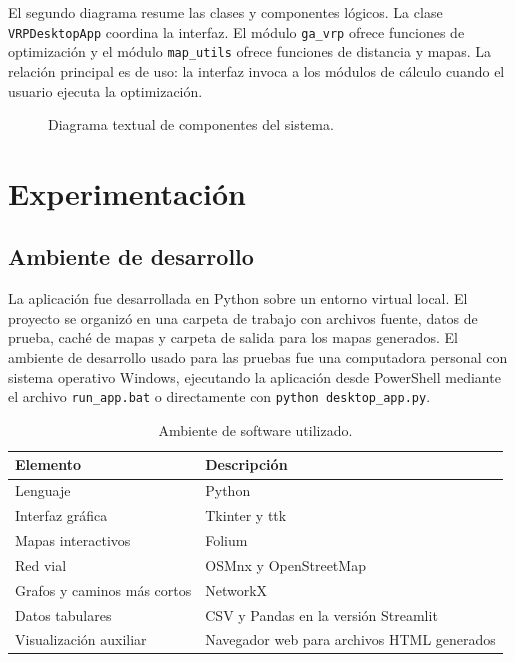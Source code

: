 \documentclass[runningheads]{llncs}
\begin{document}
El segundo diagrama resume las clases y componentes l\'ogicos. La clase
\texttt{VRPDesktopApp} coordina la interfaz. El m\'odulo \texttt{ga\_vrp} ofrece
funciones de optimizaci\'on y el m\'odulo \texttt{map\_utils} ofrece funciones de
distancia y mapas. La relaci\'on principal es de uso: la interfaz invoca a los
m\'odulos de c\'alculo cuando el usuario ejecuta la optimizaci\'on.

\begin{figure}
\centering
{}
\caption{Diagrama textual de componentes del sistema.}
\label{fig:componentes}
\end{figure}

\section{Experimentaci\'on}

\subsection{Ambiente de desarrollo}

La aplicaci\'on fue desarrollada en Python sobre un entorno virtual local. El
proyecto se organiz\'o en una carpeta de trabajo con archivos fuente, datos de
prueba, cach\'e de mapas y carpeta de salida para los mapas generados. El
ambiente de desarrollo usado para las pruebas fue una computadora personal con
sistema operativo Windows, ejecutando la aplicaci\'on desde PowerShell mediante
el archivo \texttt{run\_app.bat} o directamente con \texttt{python
desktop\_app.py}.

\begin{table}
\centering
\caption{Ambiente de software utilizado.}\label{tab:software}
\begin{tabular}{p{4cm}p{7.4cm}}
\toprule
Elemento & Descripci\'on \\
\midrule
Lenguaje & Python \\
Interfaz gr\'afica & Tkinter y ttk \\
Mapas interactivos & Folium \\
Red vial & OSMnx y OpenStreetMap \\
Grafos y caminos m\'as cortos & NetworkX \\
Datos tabulares & CSV y Pandas en la versi\'on Streamlit \\
Visualizaci\'on auxiliar & Navegador web para archivos HTML generados \\
\bottomrule
\end{tabular}
\end{table}
\end{document}
